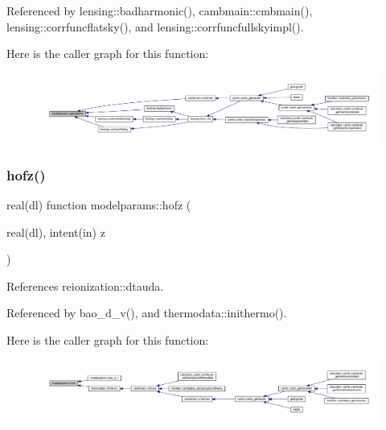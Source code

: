 Referenced by lensing\+::badharmonic(), cambmain\+::cmbmain(), lensing\+::corrfuncflatsky(), and lensing\+::corrfuncfullskyimpl().

Here is the caller graph for this function\+:
\nopagebreak
\begin{figure}[H]
\begin{center}
\leavevmode
\includegraphics[width=350pt]{namespacemodelparams_a2abd5cb7bfc9c34a736d91ed5863552d_icgraph}
\end{center}
\end{figure}
\mbox{\label{namespacemodelparams_a0180f3c86db3b86362776831ebdb2ff2}} 
\subsubsection{\texorpdfstring{hofz()}{hofz()}}
{\footnotesize\ttfamily real(dl) function modelparams\+::hofz (\begin{DoxyParamCaption}\item[{real(dl), intent(in)}]{z }\end{DoxyParamCaption})}



References reionization\+::dtauda.



Referenced by bao\+\_\+d\+\_\+v(), and thermodata\+::inithermo().

Here is the caller graph for this function\+:
\nopagebreak
\begin{figure}[H]
\begin{center}
\leavevmode
\includegraphics[width=350pt]{namespacemodelparams_a0180f3c86db3b86362776831ebdb2ff2_icgraph}
\end{center}
\end{figure}
\mbox{\label{namespacemodelparams_a463f6e148b9f2c45ec30cb28c29bb4e3}} 
